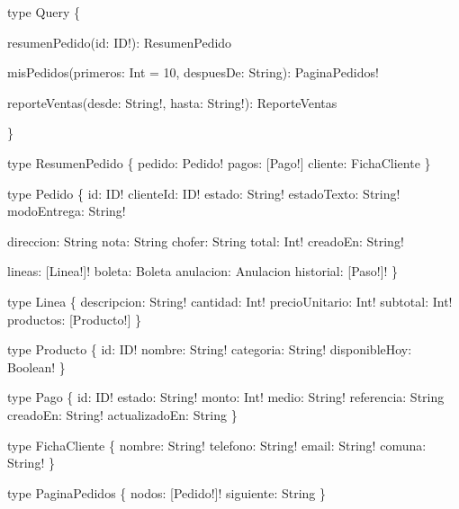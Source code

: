\begin{codigo}
type Query \{\par
\hspace*{2\ttw}resumenPedido(\allowbreak{}id:\allowbreak{} ID!):\allowbreak{} ResumenPedido\par
\hspace*{2\ttw}misPedidos(\allowbreak{}primeros:\allowbreak{} Int =\allowbreak{} 10,\allowbreak{} despuesDe:\allowbreak{} String):\allowbreak{} PaginaPedidos!\par
\hspace*{2\ttw}reporteVentas(\allowbreak{}desde:\allowbreak{} String!,\allowbreak{} hasta:\allowbreak{} String!):\allowbreak{} ReporteVentas\par
\}\par
type ResumenPedido \{ pedido:\allowbreak{} Pedido!  pagos:\allowbreak{} [\allowbreak{}Pago!]  cliente:\allowbreak{} FichaCliente \}\par
type Pedido \{ id:\allowbreak{} ID! clienteId:\allowbreak{} ID! estado:\allowbreak{} String! estadoTexto:\allowbreak{} String! modoEntrega:\allowbreak{} String!\par
\hspace*{14\ttw}direccion:\allowbreak{} String nota:\allowbreak{} String chofer:\allowbreak{} String total:\allowbreak{} Int! creadoEn:\allowbreak{} String!\par
\hspace*{14\ttw}lineas:\allowbreak{} [\allowbreak{}Linea!]! boleta:\allowbreak{} Boleta anulacion:\allowbreak{} Anulacion historial:\allowbreak{} [\allowbreak{}Paso!]! \}\par
type Linea \{ descripcion:\allowbreak{} String! cantidad:\allowbreak{} Int! precioUnitario:\allowbreak{} Int! subtotal:\allowbreak{} Int! productos:\allowbreak{} [\allowbreak{}Producto!] \}\par
type Producto \{ id:\allowbreak{} ID! nombre:\allowbreak{} String! categoria:\allowbreak{} String! disponibleHoy:\allowbreak{} Boolean! \}\par
type Pago \{ id:\allowbreak{} ID! estado:\allowbreak{} String! monto:\allowbreak{} Int! medio:\allowbreak{} String! referencia:\allowbreak{} String creadoEn:\allowbreak{} String! actualizadoEn:\allowbreak{} String \}\par
type FichaCliente \{ nombre:\allowbreak{} String! telefono:\allowbreak{} String! email:\allowbreak{} String! comuna:\allowbreak{} String! \}\par
type PaginaPedidos \{ nodos:\allowbreak{} [\allowbreak{}Pedido!]! siguiente:\allowbreak{} String \}\par

\end{codigo}
